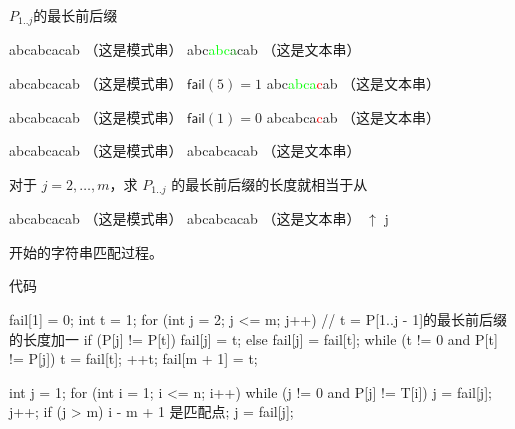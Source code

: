 \documentclass{ctexbeamer}
\newcommand{\red}[1]{\textcolor{red}{#1}}
\newcommand{\green}[1]{\textcolor{green}{#1}}
\newcommand{\lime}[1]{\textcolor{lime}{#1}}
\newcommand{\fail}{\mathsf{fail}}
\begin{document}
\begin{frame}[fragile]{$P_{1..j}$的最长前后缀}

\begin{tverb}
   abcabcacab （这是模式串）
abc\lime{abc}\green{a}cab    （这是文本串）
\end{tverb}

\begin{tverb}
   abcabcacab （这是模式串）   \(\fail(5)=1\)
abc\lime{abca}\red{c}ab    （这是文本串）
\end{tverb}

\begin{tverb}
       abcabcacab （这是模式串）   \(\fail(1)=0\)
abcabca\red{c}ab    （这是文本串）
\end{tverb}

\begin{tverb}
        abcabcacab （这是模式串）
abcabcacab    （这是文本串）
\end{tverb}

对于 $j = 2, \dots, m$，求 $P_{1..j}$ 的最长前后缀的长度就相当于从
\begin{tverb}
 abcabcacab （这是模式串）
abcabcacab    （这是文本串）
 \(\uparrow\)
 j
\end{tverb}
开始的字符串匹配过程。
\end{frame}

\begin{frame}[fragile]{代码}
\begin{cverb}
fail[1] = 0;
int t = 1;
for (int j = 2; j <= m; j++) {
// t = P[1..j - 1]的最长前后缀的长度加一
  if (P[j] != P[t])
    fail[j] = t;
  else
    fail[j] = fail[t];
  while (t != 0 and P[t] != P[j])
    t = fail[t];
  ++t;
}
fail[m + 1] = t;

int j = 1;
for (int i = 1; i <= n; i++) {
  while (j != 0 and P[j] != T[i])
    j = fail[j];
  j++;
  if (j > m) {
    i - m + 1 是匹配点;
    j = fail[j];
  }
}
\end{cverb}
\end{frame}
\end{document}
